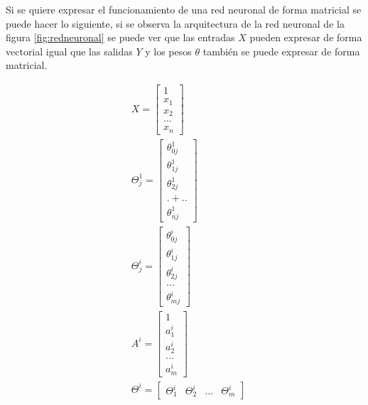 \par Si se quiere expresar el funcionamiento de una red neuronal de forma matricial se puede hacer lo siguiente, si se observa la arquitectura de la red neuronal de la figura \ref{fig:redneuronal} se puede ver que las entradas $X$ pueden expresar de forma vectorial igual que las salidas $Y$ y los pesos $\theta$ también se puede expresar de forma matricial.
\begin{spreadlines}{10pt}
	\begin{alignat}{4}
		\label{eq:1}
		 & X=\begin{bmatrix}
			1     \\
			x_{1} \\
			x_{2} \\
			...   \\
			x_{n}
		\end{bmatrix}                \\  \label{eq:2}
		 & \Theta ^{1}_{j} =\begin{bmatrix}
			\theta ^{1}_{0j} \\
			\theta ^{1}_{1j} \\
			\theta ^{1}_{2j} \\
			.+..             \\
			\theta ^{1}_{nj}
		\end{bmatrix} \\ \label{eq:3}
		 & \Theta ^{i}_{j} =\begin{bmatrix}
			\theta ^{i}_{0j} \\
			\theta ^{i}_{1j} \\
			\theta ^{i}_{2j} \\
			...              \\
			\theta ^{i}_{mj}
		\end{bmatrix} \\ \label{eq:4}
		 & A^{i} =\begin{bmatrix}
			1         \\
			a^{i}_{1} \\
			a^{i}_{2} \\
			...       \\
			a^{i}_{m}
		\end{bmatrix}           \\
		 & \Theta ^{i} =\begin{bmatrix}
			\Theta ^{i}_{1} & \Theta ^{i}_{2} & ... & \Theta ^{i}_{m}\end{bmatrix}
	\end{alignat}
\end{spreadlines}

